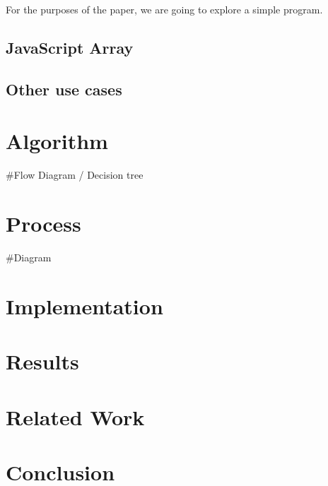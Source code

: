\documentclass{article}
\begin{document}
For the purposes of the paper, we are going to explore a simple program.



\subsection{JavaScript Array}

\subsection{Other use cases}

\section{Algorithm}

#Flow Diagram / Decision tree

\section{Process}

#Diagram

\section{Implementation}

\section{Results}

\section{Related Work}

\section{Conclusion}
\end{document}
